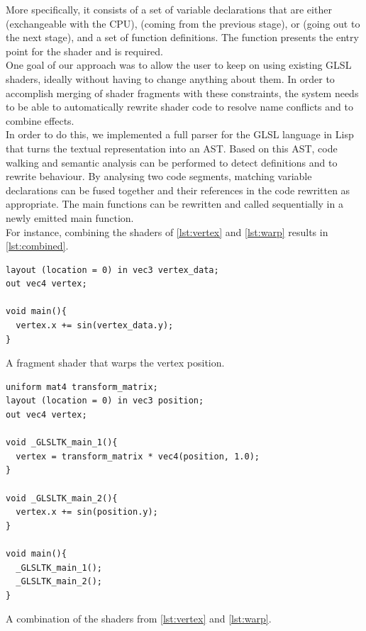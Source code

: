\documentclass{sig-alternate}
\begin{document}
More specifically, it consists of a set of variable declarations that are either  (exchangeable with the CPU),  (coming from the previous stage), or  (going out to the next stage), and a set of function definitions. The  function presents the entry point for the shader and is required. \\

One goal of our approach was to allow the user to keep on using existing GLSL shaders, ideally without having to change anything about them. In order to accomplish merging of shader fragments with these constraints, the system needs to be able to automatically rewrite shader code to resolve name conflicts and to combine effects. \\

In order to do this, we implemented a full parser for the GLSL language in Lisp that turns the textual representation into an AST. Based on this AST, code walking and semantic analysis can be performed to detect definitions and to rewrite behaviour. By analysing two code segments, matching variable declarations can be fused together and their references in the code rewritten as appropriate. The main functions can be rewritten and called sequentially in a newly emitted main function. \\

For instance, combining the shaders of \autoref{lst:vertex} and \autoref{lst:warp} results in \autoref{lst:combined}. \\

\begin{listing}[H]
\begin{verbatim}
layout (location = 0) in vec3 vertex_data;
out vec4 vertex;

void main(){
  vertex.x += sin(vertex_data.y);
}
\end{verbatim}
\caption{A fragment shader that warps the vertex position.}
\label{lst:warp}
\end{listing}

\begin{listing}[h]
\begin{verbatim}
uniform mat4 transform_matrix;
layout (location = 0) in vec3 position;
out vec4 vertex;

void _GLSLTK_main_1(){
  vertex = transform_matrix * vec4(position, 1.0);
}

void _GLSLTK_main_2(){
  vertex.x += sin(position.y);
}

void main(){
  _GLSLTK_main_1();
  _GLSLTK_main_2();
}
\end{verbatim}
\caption{A combination of the shaders from \autoref{lst:vertex} and \autoref{lst:warp}.}
\label{lst:combined}
\end{listing}
\end{document}
